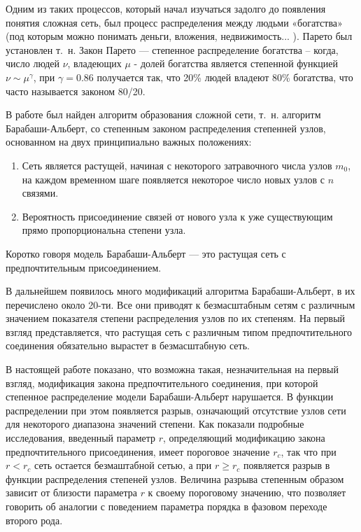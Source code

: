 \documentclass[10pt,aps,pra]{revtex4-1}
\begin{document}
    Одним из таких процессов, который начал изучаться задолго до появления понятия сложная сеть, был процесс распределения между людьми «богатства» (под которым можно понимать деньги, вложения, недвижимость... ). Парето был установлен т. н. Закон Парето \cite{Pareto} — степенное распределение богатства – когда, число людей $\nu$, владеющих $\mu$ - долей богатства является степенной функцией $\nu \sim \mu^\gamma$, при $\gamma=0.86$ получается так, что 20\% людей владеют 80\% богатства, что часто называется законом 80/20. 

    В работе \cite{AlBa1} был найден алгоритм образования сложной сети, т. н. алгоритм Барабаши-Альберт, со степенным законом распределения степенней узлов, основанном на двух принципиально важных положениях:
        \begin{enumerate} 
            \item Сеть является растущей, начиная с некоторого затравочного числа узлов $m_0$, на каждом временном шаге появляется некоторое число новых узлов с $n$ связями.
            \item Вероятность присоединение связей от нового узла к уже существующим прямо пропорциональна степени узла.
        \end{enumerate}
    Коротко говоря модель Барабаши-Альберт — это растущая сеть с предпочтительным присоединением.

    В дальнейшем появилось много модификаций алгоритма Барабаши-Альберт, в \cite{AlBa2} их перечислено около 20-ти. Все они приводят к безмасштабным сетям с различным значением показателя степени распределения узлов по их степеням. На первый взгляд представляется, что растущая сеть с различным типом предпочтительного соединения обязательно вырастет в безмасштабную сеть.

    В настоящей работе показано, что возможна такая, незначительная на первый взгляд, модификация закона предпочтительного соединения, при которой степенное распределение модели Барабаши-Альберт нарушается. В функции распределении при этом появляется разрыв, означающий отсутствие узлов сети для некоторого диапазона значений степени. Как показали подробные исследования, введенный параметр $r$, определяющий модификацию закона предпочтительного присоединения, имеет пороговое значение $r_c$, так что при $r<r_c$ сеть остается безмаштабной сетью, а при $r \geq r_c$ появляется разрыв в функции распределения степеней узлов. Величина разрыва степенным образом зависит от близости параметра $r$ к своему пороговому значению, что позволяет говорить об аналогии с поведением параметра порядка в фазовом переходе второго рода.
\end{document}
